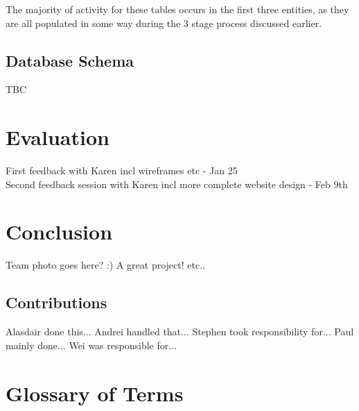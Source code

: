 \documentclass{l3proj}
\begin{document}
The majority of activity for these tables occurs in the first three entities, as they are all populated in some way during the 3 stage process discussed earlier.

\section{Database Schema}
TBC

\chapter{Evaluation}

First feedback with Karen incl wireframes etc - Jan 25\\
Second feedback session with Karen incl more complete website design - Feb 9th

\chapter{Conclusion}

Team photo goes here? :)
A great project! etc..

\section{Contributions}

Alasdair done this...
Andrei handled that...
Stephen took responsibility for... 
Paul mainly done...
Wei was responsible for...	





\appendix
\chapter{Glossary of Terms}
\label{sec:gloss}
\end{document}
